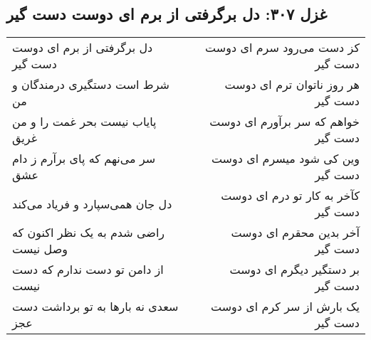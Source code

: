 \begin{center}
\section*{غزل ۳۰۷: دل برگرفتی از برم ای دوست دست گیر}
\label{sec:307}
\begin{longtable}{l p{0.5cm} r}
دل برگرفتی از برم ای دوست دست گیر
&&
کز دست می‌رود سرم ای دوست دست گیر
\\
شرط است دستگیری درمندگان و من
&&
هر روز ناتوان ترم ای دوست دست گیر
\\
پایاب نیست بحر غمت را و من غریق
&&
خواهم که سر برآورم ای دوست دست گیر
\\
سر می‌نهم که پای برآرم ز دام عشق
&&
وین کی شود میسرم ای دوست دست گیر
\\
دل جان همی‌سپارد و فریاد می‌کند
&&
کآخر به کار تو درم ای دوست دست گیر
\\
راضی شدم به یک نظر اکنون که وصل نیست
&&
آخر بدین محقرم ای دوست دست گیر
\\
از دامن تو دست ندارم که دست نیست
&&
بر دستگیر دیگرم ای دوست دست گیر
\\
سعدی نه بارها به تو برداشت دست عجز
&&
یک بارش از سر کرم ای دوست دست گیر
\\
\end{longtable}
\end{center}
